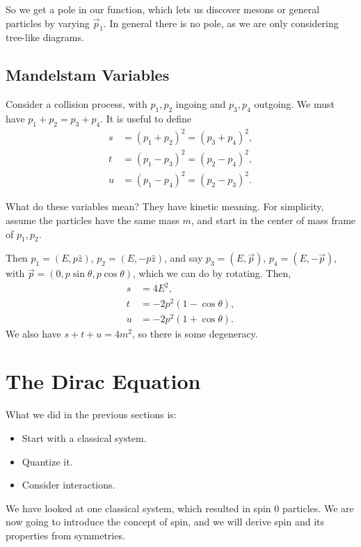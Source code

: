 \documentclass[12pt]{article}
\begin{document}
So we get a pole in our function, which lets us discover mesons or general particles by varying $\overrightarrow p_1$. In general there is no pole, as we are only considering tree-like diagrams.

\subsection{Mandelstam Variables}%
\label{sub:mvars}

Consider a collision process, with $p_1, p_2$ ingoing and $p_3, p_4$ outgoing. We must have $p_1 + p_2 = p_3 + p_4$. It is useful to define
\begin{align*}
	s &= (p_1 + p_2)^2 = (p_3 + p_4)^2, \\
	t &= (p_1 - p_3)^2 = (p_2 - p_4)^2, \\
	u &= (p_1 - p_4)^2 = (p_2 - p_3)^2.
\end{align*}

What do these variables mean? They have kinetic meaning. For simplicity, assume the particles have the same mass $m$, and start in the center of mass frame of $p_1, p_2$.

Then $p_1 = (E, p \hat z)$, $p_2 = (E, -p \hat z)$, and say $p_3 = (E, \overrightarrow p)$, $p_4 = (E, - \overrightarrow p)$, with $\overrightarrow p = (0, p \sin \theta, p \cos \theta)$, which we can do by rotating. Then,
\begin{align*}
	s &= 4 E^2, \\
	t &= -2p^2(1 - \cos \theta), \\
	u &= -2p^2(1 + \cos \theta).
\end{align*}
We also have $s + t + u = 4m^2$, so there is some degeneracy.


\newpage

\section{The Dirac Equation}%
\label{sec:de}

What we did in the previous sections is:
\begin{itemize}
	\item Start with a classical system.
	\item Quantize it.
	\item Consider interactions.
\end{itemize}

We have looked at one classical system, which resulted in spin 0 particles. We are now going to introduce the concept of spin, and we will derive spin and its properties from symmetries.
\end{document}
